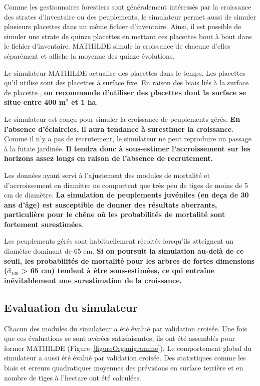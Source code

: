 \documentclass[a4paper,12pt]{article}
\begin{document}
Comme les gestionnaires forestiers sont généralement intéressés par la croissance des strates d'inventaire ou des peuplements, le simulateur permet aussi de simuler plusieurs placettes dans un même fichier d'inventaire. Ainsi, il est possible de simuler une strate de quinze placettes en mettant ces placettes bout à bout dans le fichier d'inventaire. MATHILDE simule la croissance de chacune d'elles séparément et affiche la moyenne des quinze évolutions.

Le simulateur MATHILDE actualise des placettes dans le temps. Les placettes qu'il utilise sont des placettes à surface fixe. En raison des biais liés à la surface de placette \citep[cf.][]{sambakhe_bias_2014}, \textbf{on recommande d'utiliser des placettes dont la surface se situe entre 400 m$^2$ et 1 ha}. 

Le simulateur est conçu pour simuler la croissance de peuplements gérés. \textbf{En l'absence d'éclaircies, il aura tendance à surestimer la croissance}. Comme il n'y a pas de recrutement, le simulateur ne peut reproduire un passage à la futaie jardinée. \textbf{Il tendra donc à sous-estimer l'accroissement sur les horizons assez longs en raison de l'absence de recrutement.}

Les données ayant servi à l'ajustement des modules de mortalité et d'accroissement en diamètre ne comportent que très peu de tiges de moins de 5 cm de diamètre. \textbf{La simulation de peuplements juvéniles (en deça de 30 ans d'âge) est susceptible de donner des résultats aberrants, particulière pour le chêne où les probabilités de mortalité sont fortement surestimées}. 

Les peuplements gérés sont habituellement récoltés lorsqu'ils atteignent un diamètre dominant de 65 cm. \textbf{Si on poursuit la simulation au-delà de ce seuil, les probabilités de mortalité pour les arbres de fortes dimensions ($\text{d}_{130}$ > 65 cm) tendent à être sous-estimées, ce qui entraîne inévitablement une surestimation de la croissance.}

\subsection{Evaluation du simulateur}

Chacun des modules du simulateur a été évalué par validation croisée. Une fois que ces évaluations se sont avérées satisfaisantes, ils ont été assemblés pour former MATHILDE (Figure~\ref{figureOrganigramme}). Le comportement global du simulateur a aussi été évalué par validation croisée. Des statistiques comme les biais et erreurs quadratiques moyennes des prévisions en surface terrière et en nombre de tiges à l'hectare ont été calculées.
\end{document}
